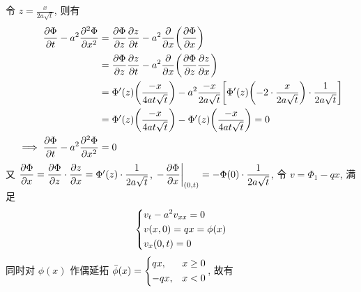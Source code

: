 \begin{solution}
令 $z = \frac{x}{2a\sqrt{t}}$, 则有
\[ \begin{aligned}
{\frac{\partial {\Phi}}{\partial {t}}} - a^2 {\frac{\partial {^2\Phi}}{\partial {x^2}}}
&= {\frac{\partial {\Phi}}{\partial {z}}} {\frac{\partial {z}}{\partial {t}}}
 - a^2 {{\frac{\partial {}}{\partial {x}}}}{\left( {{\frac{\partial {\Phi}}{\partial {x}}}} \right)} \\
&= {\frac{\partial {\Phi}}{\partial {z}}} {\frac{\partial {z}}{\partial {t}}}
 - a^2 {{\frac{\partial {}}{\partial {x}}}}{\left( {{\frac{\partial {\Phi}}{\partial {z}}}{\frac{\partial {z}}{\partial {x}}}} \right)} \\
&= \Phi'(z) {\left( {\frac{-x}{4at\sqrt{t}}} \right)}
 - a^2 \frac{-x}{2a\sqrt{t}} {\left[ {
  \Phi'(z) {\left( {-2 \cdot \frac{x}{2a\sqrt{t}}} \right)} \cdot \frac{1}{2a\sqrt{t}}
 } \right]} \\
&= \Phi'(z) {\left( {\frac{-x}{4at\sqrt{t}}} \right)}
 - \Phi'(z) {\left( {\frac{-x}{4at\sqrt{t}}} \right)} = 0\\
\implies {\frac{\partial {\Phi}}{\partial {t}}} - a^2 {\frac{\partial {^2\Phi}}{\partial {x^2}}} &= 0
\end{aligned} \]
又 ${\dfrac{\partial {\Phi}}{\partial {x}}} = {\dfrac{\partial {\Phi}}{\partial {z}}} \cdot {\dfrac{\partial {z}}{\partial {x}}}
= \Phi'(z) \cdot \dfrac{1}{2a\sqrt{t}}$,
$-{\left.{{\dfrac{\partial {\Phi}}{\partial {x}}}} \right|}_{(0, t)}=-\Phi(0)\cdot \dfrac{1}{2a\sqrt{t}}$,
令 $v = \Phi_1 - qx$, 满足
\[ \begin{dcases}
v_t - a^2 v_{xx} = 0 \\
v(x, 0) = qx = \phi(x) \\
v_x(0, t) = 0
\end{dcases} \]
同时对 $\phi(x)$ 作偶延拓
$\bar{\phi}(x) = \begin{dcases}qx,&x\geq0\\-qx,&x<0\end{dcases}$, 故有


\end{solution}
